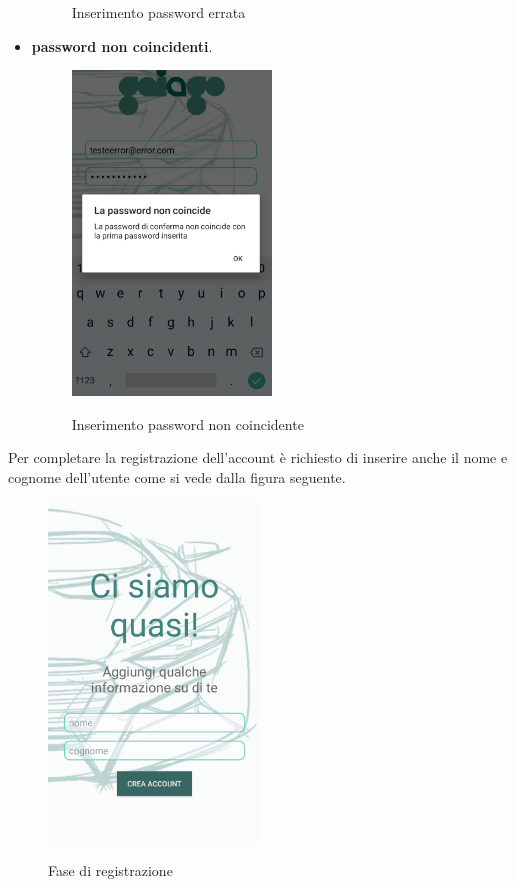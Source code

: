 \begin{itemize}
\begin{figure}[H]
		\caption{Inserimento password errata}
		\label{error_psw}
	\end{figure}
\pagebreak
	\item \textbf{password non coincidenti}.
	\begin{figure}[H] 
		\centering 
		\includegraphics[width=0.5\textwidth]{res/images/errore_psw_diverse.png}\\
		\caption{Inserimento password non coincidente}
		\label{error_psw2}
	\end{figure}
\pagebreak
\end{itemize} 

\pagebreak
Per completare la registrazione dell'account è richiesto di inserire anche il nome e cognome dell'utente come si vede dalla figura seguente.
 \begin{figure}[H] 
	\centering 
	\includegraphics[width=0.5\textwidth]{res/images/registrazione2.png}\\
	\caption{Fase di registrazione}
	\label{registrazione2}
\end{figure}

